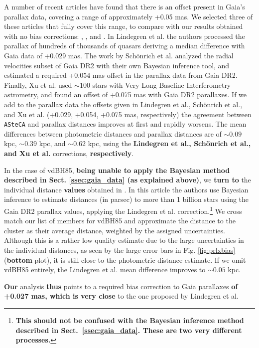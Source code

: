 \documentclass[referee]{aa}
\begin{document}
A number of recent articles have found that there is an offset present in
Gaia's parallax data, covering a range of approximately +0.05 mas. We selected
three of these articles that fully cover this range, to compare with our
results obtained with no bias corrections: \cite{Lindegren_2018},
\cite{Schonrich2019}, and \cite{Xu_2019}.
%
In Lindegren et al. the authors processed the parallax of hundreds of
thousands of quasars deriving a median difference with Gaia data of +0.029 mas.
The work by Sch\"onrich et al. analyzed the radial velocities subset of Gaia
DR2 with their own Bayesian inference tool, and estimated a required +0.054 mas
offset in the parallax data from Gaia DR2. Finally, Xu et al. used $\sim$100
stars with Very Long Baseline Interferometry astrometry, and found an offset of
+0.075 mas with Gaia DR2 parallaxes. 
%
If we add to the parallax data the offsets given in Lindegren et al., 
Sch\"onrich et al., and Xu et al. (+0.029, +0.054, +0.075 mas,
respectively) the agreement between \texttt{ASteCA} and parallax distances
improves at first and rapidly worsens. The mean differences between photometric
distances and parallax distances are of $\sim0.09$ kpc, $\sim0.39$ kpc, and
$\sim0.62$ kpc, using the \textbf{Lindegren et al., Sch\"onrich et al., and Xu
et al.} corrections, \textbf{respectively}.

In the case of vdBH85, \textbf{being unable to apply the Bayesian method
described in Sect. \ref{ssec:gaia_data} (as explained above)}, we \textbf{turn
to} the individual distance \textbf{values} obtained in
\cite{BailerJones_2018}.
In this article the authors use Bayesian inference to estimate distances (in
parsec) to more than 1 billion stars using the Gaia DR2 parallax values,
applying the Lindegren et al. correction.\footnote{\textbf{This should not be
confused with the Bayesian inference method described in
Sect.~\ref{ssec:gaia_data}. These are two very different processes.}}
We cross match our list of members for vdBH85 and approximate the distance to
the cluster as their average distance, weighted by the assigned uncertainties.
Although this is a rather low quality estimate due to the large
uncertainties in the individual distances, as seen by the large error bars
in Fig. \ref{fig:prlxbias} (\textbf{bottom} plot), it is still close to the
photometric distance estimate.
If we omit vdBH85 entirely, the Lindegren et al. mean difference improves to
$\sim0.05$ kpc.

\textbf{Our} analysis \textbf{thus} points to a required bias correction to Gaia
parallaxes \textbf{of +0.027 mas, which is very close} to the one
proposed by Lindegren et al.\\
\end{document}
